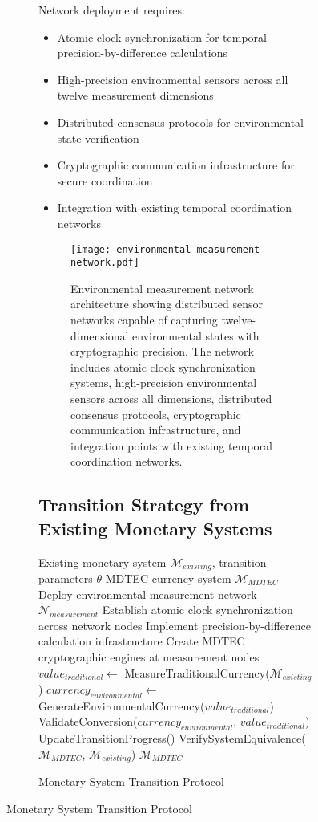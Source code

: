 \documentclass[12pt,a4paper]{article}
\begin{document}
\begin{figure}[H]
\begin{figure}[H]
Network deployment requires:
\begin{itemize}
\item Atomic clock synchronization for temporal precision-by-difference calculations
\item High-precision environmental sensors across all twelve measurement dimensions
\item Distributed consensus protocols for environmental state verification
\item Cryptographic communication infrastructure for secure coordination
\item Integration with existing temporal coordination networks
\end{itemize}

\begin{figure}[H]
\centering
\texttt{[image: environmental-measurement-network.pdf]}
\caption{Environmental measurement network architecture showing distributed sensor networks capable of capturing twelve-dimensional environmental states with cryptographic precision. The network includes atomic clock synchronization systems, high-precision environmental sensors across all dimensions, distributed consensus protocols, cryptographic communication infrastructure, and integration points with existing temporal coordination networks.}
\label{fig:environmental_measurement_network}
\end{figure}

\subsection{Transition Strategy from Existing Monetary Systems}

\begin{algorithm}
\caption{Monetary System Transition Protocol}
\begin{algorithmic}[1]
\Require Existing monetary system $\mathcal{M}_{existing}$, transition parameters $\theta$
\Ensure MDTEC-currency system $\mathcal{M}_{MDTEC}$
\State Deploy environmental measurement network $\mathcal{N}_{measurement}$
\State Establish atomic clock synchronization across network nodes
\State Implement precision-by-difference calculation infrastructure
\State Create MDTEC cryptographic engines at measurement nodes
    \State $value_{traditional} \leftarrow$ MeasureTraditionalCurrency($\mathcal{M}_{existing}$)
    \State $currency_{environmental} \leftarrow$ GenerateEnvironmentalCurrency($value_{traditional}$)
    \State ValidateConversion($currency_{environmental}$, $value_{traditional}$)
    \State UpdateTransitionProgress()
\EndWhile
\State VerifySystemEquivalence($\mathcal{M}_{MDTEC}$, $\mathcal{M}_{existing}$)
\Return $\mathcal{M}_{MDTEC}$
\end{algorithmic}
\end{algorithm}


\end{figure}
\end{figure}
\end{document}
